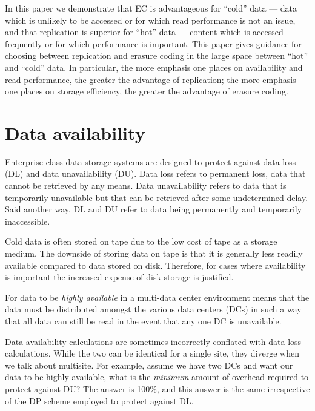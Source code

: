 \documentclass[11pt]{article}
\begin{document}



In this paper we demonstrate that EC is advantageous for ``cold'' data --- data which is unlikely to be accessed or for which read performance is not an issue, and that replication is superior for ``hot'' data --- content which is accessed frequently or for which performance is important. This paper gives guidance for choosing between replication and erasure coding in the large space between ``hot'' and ``cold'' data. In particular, the more emphasis one places on availability and read performance, the greater the advantage of replication; the more emphasis one places on storage efficiency, the greater the advantage of erasure coding. 

\section{Data availability}

Enterprise-class data storage systems are designed to protect against data loss (DL) and data unavailability (DU). Data loss refers to permanent loss, data that cannot be retrieved by any means. Data unavailability refers to data that is temporarily unavailable but that can be retrieved after some undetermined delay. Said another way, DL and DU refer to data being permanently and temporarily inaccessible.

Cold data is often stored on tape due to the low cost of tape as a storage medium. The downside of storing data on tape is that it is generally less readily available compared to data stored on disk. Therefore, for cases where availability is important the increased expense of disk storage is justified. 

For data to be \emph{highly available} in a multi-data center environment means that the data must be distributed amongst the various data centers (DCs) in such a way that all data can still be read in the event that any one DC is unavailable. 

Data availability calculations are sometimes incorrectly conflated with data loss calculations. While the two can be identical for a single site, they diverge when we talk about multisite. For example, assume we have two DCs and want our data to be highly available, what is the \emph{minimum} amount of overhead required to protect against DU? The answer is 100\%, and this answer is the same irrespective of the DP scheme employed to protect against DL.
\end{document}
